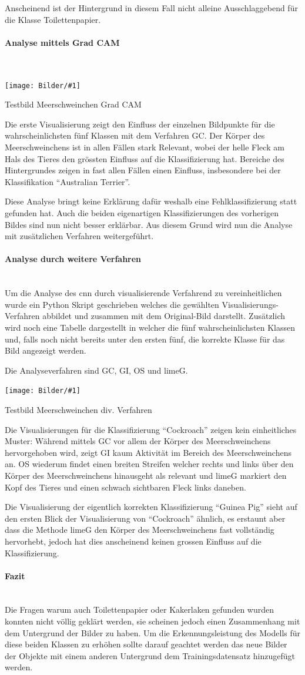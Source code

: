\documentclass[
  12pt, %
  a4paper, %
  oneside, %
  openany, 
  numbers=noenddot, %
  BCOR=5mm, %
  parskip=half*, %
  thesis, %
]{bfhbook}
\newcommand{\parag}[1]{\paragraph*{#1}\mbox{}\\}
\newcommand{\imgText}[3]{
\begin{center}
    \begin{minipage}[t]{0.6\textwidth}
    		\vspace{0pt}
		\texttt{[image: Bilder/\#1]}
		\caption{#2}
	\end{minipage}\hfill
    \begin{minipage}[t]{0.4\textwidth}
    		\vspace{5pt}
  		#3
    \end{minipage}
\end{center}
}
\begin{document}
\break
Anscheinend ist der Hintergrund in diesem Fall nicht alleine Ausschlaggebend für die Klasse Toilettenpapier.
\parag{Analyse mittels Grad CAM}
\imgText{Oreo-Grad-Cam-Classes.png}{Testbild Meerschweinchen Grad CAM}{
Die erste Visualisierung zeigt den Einfluss der einzelnen Bildpunkte für die wahrscheinlichsten fünf Klassen mit dem Verfahren \Gls{GC}. Der Körper des Meerschweinchens ist in allen Fällen stark Relevant, wobei der helle Fleck am Hals des Tieres den grössten Einfluss auf die Klassifizierung hat. Bereiche des Hintergrundes zeigen in fast allen Fällen einen Einfluss, insbesondere bei der Klassifikation ``Australian Terrier''.
}
Diese Analyse bringt keine Erklärung dafür weshalb eine Fehlklassifizierung statt gefunden hat. Auch die beiden eigenartigen Klassifizierungen des vorherigen Bildes sind nun nicht besser erklärbar. Aus diesem Grund wird nun die Analyse mit zusätzlichen Verfahren weitergeführt.

\parag{Analyse durch weitere Verfahren}
Um die Analyse des \Gls{cnn} durch visualisierende Verfahrend zu vereinheitlichen wurde ein Python Skript geschrieben \cite{imgClassCombined} welches die gewählten Visualisierungs-Verfahren abbildet und zusammen mit dem Original-Bild darstellt. Zusätzlich wird noch eine Tabelle dargestellt in welcher die fünf wahrscheinlichsten Klassen und, falls noch nicht bereits unter den ersten fünf, die korrekte Klasse für das Bild angezeigt werden.

 Die Analyseverfahren sind \Gls{GC}, \Gls{GI}, \Gls{OS} und \Gls{limeG}.
\imgText{Oreo-Classification.png}{Testbild Meerschweinchen div. Verfahren}{
Die Visualisierungen für die Klassifizierung ``Cockroach''  zeigen kein einheitliches Muster: \break 
Während mittels \Gls{GC} vor allem der Körper des Meerschweinchens hervorgehoben wird, zeigt \Gls{GI} kaum Aktivität im Bereich des Meerschweinchens an. 
\break\break 
\Gls{OS} wiederum findet einen breiten Streifen welcher rechts und links über den Körper des Meerschweinchens hinausgeht als relevant und \Gls{limeG} markiert den Kopf des Tieres und einen schwach sichtbaren Fleck links daneben. \break
}
Die Visualisierung der eigentlich korrekten Klassifizierung ``Guinea Pig'' sieht auf den ersten Blick der Visualisierung von ``Cockroach'' ähnlich, es erstaunt aber dass die Methode \Gls{limeG} den Körper des Meerschweinchens fast vollständig hervorhebt, jedoch hat dies anscheinend keinen grossen Einfluss auf die Klassifizierung.

\parag{Fazit}
Die Fragen warum auch Toilettenpapier oder Kakerlaken gefunden wurden konnten nicht völlig geklärt werden, sie scheinen jedoch einen Zusammenhang mit dem Untergrund der Bilder zu haben. Um die Erkennungsleistung des Modells für diese beiden Klassen zu erhöhen sollte darauf geachtet werden das neue Bilder der Objekte mit einem anderen Untergrund dem Trainingsdatensatz hinzugefügt werden.
\end{document}

